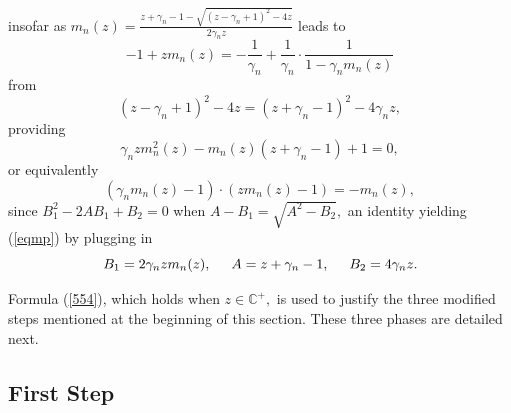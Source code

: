 \documentclass{article}
\numberwithin{equation}{section}
\begin{document}
insofar as \(m_n(z)=\frac{z+\gamma_n-1-\sqrt{(z-\gamma_n+1)^2-4z}}{2\gamma_n z}\) leads to
\begin{equation}\label{55}
    -1+zm_n(z)=-\frac{1}{\gamma_n}+\frac{1}{\gamma_n} \cdot \frac{1}{1-\gamma_n m_n(z)}
\end{equation}
from
\[(z-\gamma_n+1)^2-4z=(z+\gamma_n-1)^2-4\gamma_nz,\]
providing
\begin{equation}\label{eqmp}
    \gamma_n zm^2_n(z)-m_n(z)(z+\gamma_n-1)+1=0,
\end{equation}
or equivalently %
\[(\gamma_n m_n(z)-1) \cdot (zm_n(z)-1)=-m_n(z),\]
since \(B_1^2-2AB_1+B_2=0\) when \(A-B_1=\sqrt{A^2-B_2},\) an identity yielding (\ref{eqmp}) by plugging in
\[B_1=2\gamma_n zm_n(z), \hspace{0.5cm} A=z+\gamma_n-1 , \hspace{0.5cm} B_2=4\gamma_nz.\] 
\par
Formula (\ref{554}), which holds when \(z \in \mathbb{C}^{+},\) is used to justify the three modified steps mentioned at the beginning of this section. These three phases are detailed next.

\subsection*{First Step}%
\end{document}
